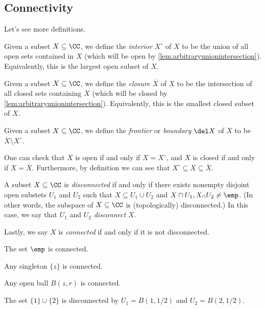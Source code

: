 \subsection{Connectivity}
Let's see more definitions.
\begin{definition}[Interior]
	Given a subset $X\subseteq\CC$, we define the \textit{interior} $X^\circ$ of $X$ to be the union of all open sets contained in $X$ (which will be open by \autoref{lem:arbitraryunionintersection}). Equivalently, this is the largest open subset of $X$.
\end{definition}
\begin{definition}[Closure]
	Given a subset $X\subseteq\CC$, we define the \textit{closure} $\overline X$ of $X$ to be the intersection of all closed sets containing $X$ (which will be closed by \autoref{lem:arbitraryunionintersection}). Equivalently, this is the smallest closed subset of $X$.
\end{definition}
\begin{definition}
	Given a subset $X\subseteq\CC$, we define the \textit{frontier} or \textit{boundary} $\del X$ of $X$ to be $\overline X\setminus X^\circ$.
\end{definition}
One can check that $X$ is open if and only if $X=X^\circ$, and $X$ is closed if and only if $X=\overline X$. Furthermore, by definition we can see that $X^\circ\subseteq X\subseteq\overline X$.
\begin{definition}[Disconnected]
	A subset $X\subseteq\CC$ is \textit{disconnected} if and only if there exists nonempty disjoint open substets $U_1$ and $U_2$ such that $X\subseteq U_1\cup U_2$ and $X\cap U_1,X_\cap U_2\ne\emp$. (In other words, the subspace of $X\subseteq\CC$ is (topologically) disconnected.) In this case, we say that $U_1$ and $U_2$ \textit{disconnect} $X$.

	Lastly, we say $X$ is \textit{connected} if and only if it is not disconnected.
\end{definition}
\begin{example}
	The set $\emp$ is connected.
\end{example}
\begin{example}
	Any singleton $\{z\}$ is connected.
\end{example}
\begin{ex}
	Any open ball $B(z,r)$ is connected.\todo{}
\end{ex}
\begin{example}
	The set $\{1\}\cup\{2\}$ is disconnected by $U_1=B(1,1/2)$ and $U_2=B(2,1/2)$.
\end{example}
